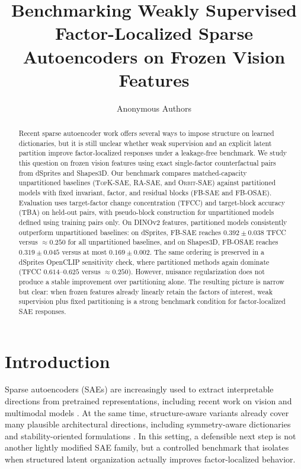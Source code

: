\documentclass[10pt,twocolumn]{article}
\title{Benchmarking Weakly Supervised Factor-Localized Sparse Autoencoders on Frozen Vision Features}
\author{Anonymous Authors}
\date{}
\newcommand{\method}[1]{\textsc{#1}}
\newcommand{\tfcc}{\textsc{TFCC}}
\newcommand{\tba}{\textsc{TBA}}
\begin{document}
\maketitle

\begin{abstract}
Recent sparse autoencoder work offers several ways to impose structure on learned dictionaries, but it is still unclear whether weak supervision and an explicit latent partition improve factor-localized responses under a leakage-free benchmark. We study this question on frozen vision features using exact single-factor counterfactual pairs from dSprites and Shapes3D. Our benchmark compares matched-capacity unpartitioned baselines (\method{TopK-SAE}, \method{RA-SAE}, and \method{Orbit-SAE}) against partitioned models with fixed invariant, factor, and residual blocks (\method{FB-SAE} and \method{FB-OSAE}). Evaluation uses target-factor change concentration (\tfcc{}) and target-block accuracy (\tba{}) on held-out pairs, with pseudo-block construction for unpartitioned models defined using training pairs only. On DINOv2 features, partitioned models consistently outperform unpartitioned baselines: on dSprites, \method{FB-SAE} reaches $0.392 \pm 0.038$ \tfcc{} versus $\approx 0.250$ for all unpartitioned baselines, and on Shapes3D, \method{FB-OSAE} reaches $0.319 \pm 0.045$ versus at most $0.169 \pm 0.002$. The same ordering is preserved in a dSprites OpenCLIP sensitivity check, where partitioned methods again dominate (\tfcc{} $0.614$--$0.625$ versus $\approx 0.250$). However, nuisance regularization does not produce a stable improvement over partitioning alone. The resulting picture is narrow but clear: when frozen features already linearly retain the factors of interest, weak supervision plus fixed partitioning is a strong benchmark condition for factor-localized SAE responses.
\end{abstract}

\section{Introduction}
Sparse autoencoders (SAEs) are increasingly used to extract interpretable directions from pretrained representations, including recent work on vision and multimodal models \citep{mateusz2025sparse,thomas2025archetypal}. At the same time, structure-aware variants already cover many plausible architectural directions, including symmetry-aware dictionaries \citep{liv2024group,ege2025group} and stability-oriented formulations \citep{thomas2025archetypal}. In this setting, a defensible next step is not another lightly modified SAE family, but a controlled benchmark that isolates when structured latent organization actually improves factor-localized behavior.
\end{document}
